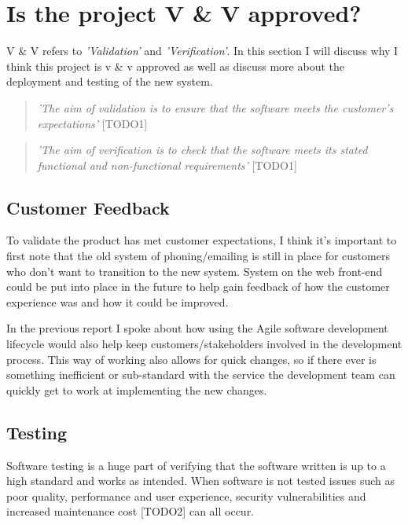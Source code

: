\section{Is the project V \& V approved?}
  V \& V refers to \textit{'Validation'} and \textit{'Verification'}. In this section I will discuss why I think this project is v \&
  v approved as well as discuss more about the deployment and testing of the new system.

  \begin{quote}
    \textit{'The aim of validation is to ensure that the software meets the customer's expectations'} [TODO1]
  \end{quote}

  \begin{quote}
    \textit{'The aim of verification is to check that the software meets its stated functional and non-functional requirements'} [TODO1]
  \end{quote}


  \subsection{Customer Feedback}
  To validate the product has met customer expectations, I think it's important to first note that the old system of phoning/emailing is still in 
  place for customers who don't want to transition to the new system. System on the web front-end could be put into place in the future to help 
  gain feedback of how the customer experience was and how it could be improved.

  In the previous report I spoke about how using the Agile software development lifecycle would also help keep customers/stakeholders involved in the 
  development process. This way of working also allows for quick changes, so if there ever is something inefficient or sub-standard with the service the 
  development team can quickly get to work at implementing the new changes.
  
  \subsection{Testing}
  \label{sec:Testing}

  Software testing is a huge part of verifying that the software written is up to a high standard and works as intended. When software is not
  tested issues such as poor quality, performance and user experience, security vulnerabilities and increased maintenance cost [TODO2] can all 
  occur.


